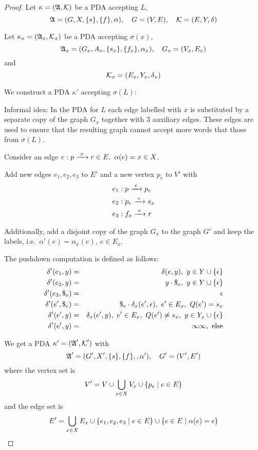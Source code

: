 \begin{proof}
Let $\kappa = (\mbox{$\mathfrak{A}$}, \mbox{$\mathcal{K}$})$ be a PDA accepting $L$,
\[ \mbox{$\mathfrak{A}$}=(G, X, \mbox{$\{s\}$}, \mbox{$\{f\}$}, \alpha),\quad G=(V,E),\quad
\mbox{$\mathcal{K}$}=(E, Y, \delta)
\]

Let $\kappa_x = (\mbox{$\mathfrak{A}$}_x, \mbox{$\mathcal{K}$}_x)$ be a PDA accepting $\sigma(x)$,
\[ \mbox{$\mathfrak{A}$}_x = (G_x, A_x, \mbox{$\{s_x\}$}, \mbox{$\{f_x\}$}, \alpha_x),\quad G_x=(V_x,
E_x) \] and
\[ \mbox{$\mathcal{K}$}_x = (E_x, Y_x, \delta_x) \]

We construct a PDA $\kappa'$ accepting $\sigma(L)$:

Informal idea: In the PDA for $L$ each edge labelled with $x$ is substituted by
a separate copy of the graph $G_x$ together with 3 auxiliary edges. These edges
are used to ensure that the resulting graph cannot accept more words that those
from $\sigma(L)$.

\missingfigure

Consider an edge $e: p \edge{x} r \in E,\ \alpha(e)=x\in X$.

Add new edges $e_1, e_2, e_3$ to $E'$ and a new vertex $p_e$ to $V'$ with
\begin{eqnarray*}
& e_1: p \xrightarrow{\ {\epsilon}\ } p_e \\
& e_2: p_e \xrightarrow{\ {\epsilon}\ } s_x \\
& e_3: f_x \xrightarrow{\ {\epsilon}\ } r
\end{eqnarray*}

Additionally, add a disjoint copy of the graph $G_x$ to the graph $G'$ and keep
the labels, i.e.\ $\alpha'(e) = \alpha_x(e),\ e\in E_x$.

The pushdown computation is defined as follows:
\begin{eqnarray*}
\delta'(e_1, y) &=& \delta(e, y),\ y\in Y\cup\setof{\epsilon} \\
\delta'(e_2, y) &=& y \cdot {\$}_e,\ y\in Y\cup\setof{\epsilon} \\
\delta'(e_3, {\$}_e) &=& \epsilon \\
\delta'(e', {\$}_e) &=& {\$}_e \cdot \delta_x(e', \epsilon),\ e'\in E_x,\ Q(e')
=s_x \\
\delta'(e', y) &=& \delta_x(e', y),\ e'\in E_x,\ Q(e')\neq s_x,\ y\in Y_x \cup
\setof{\epsilon} \\
\delta'(e', y) &=& \infty\infty,\text{ else}
\end{eqnarray*}

We get a PDA $\kappa' = (\mbox{$\mathfrak{A}$}', \mbox{$\mathcal{K}$}')$ with
\[ \mbox{$\mathfrak{A}$}' = (G', X', \mbox{$\{s\}$}, \mbox{$\{f\}$}, ,\alpha'),\quad G'=(V',E') \]
where the vertex set is
\[ V' = V \cup \bigcup_{x \in X} V_x \cup \mbox{$\{p_e \mid e \in E\}$} \]
and the edge set is
\[ E' = \bigcup_{x \in X} E_x \cup \mbox{$\{e_1, e_2, e_3 \mid e \in E\}$} \cup
\mbox{$\{e \in E \mid \alpha(e) = \epsilon\}$} \]


\end{proof}
